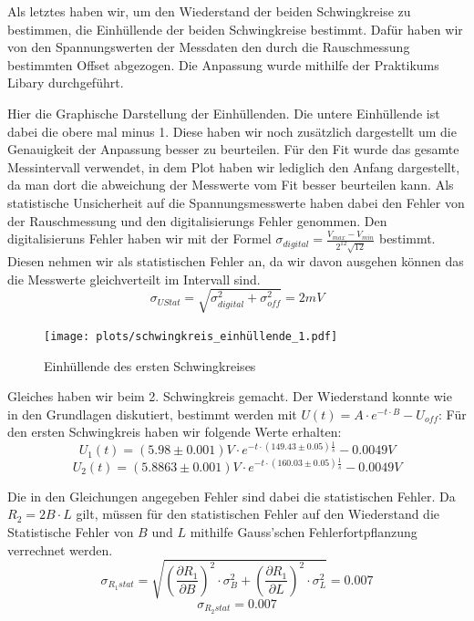 \documentclass[twoside]{protokoll}
\begin{document}
Als letztes haben wir, um den Wiederstand der beiden Schwingkreise zu bestimmen, die Einhüllende der beiden Schwingkreise bestimmt.
Dafür haben wir von den Spannungswerten der Messdaten den durch die Rauschmessung bestimmten Offset abgezogen.
Die Anpassung wurde mithilfe der Praktikums Libary durchgeführt.
 
Hier die Graphische Darstellung der Einhüllenden.
Die untere Einhüllende ist dabei die obere mal minus 1.
Diese haben wir noch zusätzlich dargestellt um die Genauigkeit der Anpassung besser zu beurteilen.
Für den Fit wurde das gesamte Messintervall verwendet, in dem Plot haben wir lediglich den Anfang dargestellt, da man dort die abweichung der Messwerte vom Fit besser beurteilen kann.
Als statistische Unsicherheit auf die Spannungsmesswerte haben dabei den Fehler von der Rauschmessung und den digitalisierungs Fehler genommen.
Den digitalisieruns Fehler haben wir mit der Formel $ \sigma_{digital} = \frac{V_{max} - V_{min}}{2^{12} \sqrt{12}}$ bestimmt.
Diesen nehmen wir als statistischen Fehler an, da wir davon ausgehen können das die Messwerte gleichverteilt im Intervall sind.
\begin{equation}
    \sigma_{U Stat} = \sqrt{ \sigma_{digital}^2 +  \sigma_{off}^2} = 2mV
\end{equation}
\begin{figure}[H]
    \centering
    \texttt{[image: plots/schwingkreis\_einhüllende\_1.pdf]}
    \caption{Einhüllende des ersten Schwingkreises}
\end{figure}

Gleiches haben wir beim 2. Schwingkreis gemacht.
Der Wiederstand konnte wie in den Grundlagen diskutiert, bestimmt werden mit $ U(t) = A \cdot e^{-t \cdot B} - U_{off}$:
Für den ersten Schwingkreis haben wir folgende Werte erhalten:
\begin{equation}
    U_1(t) = (5.98 \pm 0.001)V \cdot e^{-t \cdot (149.43 \pm 0.05) \frac{1}{s} } - 0.0049 V
\end{equation}
\begin{equation}
    U_2(t) = (5.8863 \pm 0.001)V \cdot e^{-t \cdot (160.03 \pm 0.05) \frac{1}{s} } - 0.0049 V
\end{equation}

Die in den Gleichungen angegeben Fehler sind dabei die statistischen Fehler.
Da $R_2 = 2 B \cdot L$ gilt, müssen für den statistischen Fehler auf den Wiederstand die Statistische Fehler von $B$ und $L$ mithilfe Gauss'schen Fehlerfortpflanzung verrechnet werden.
\begin{equation}
    \sigma_{R_1 stat} = \sqrt{ \left( \frac{\partial R_1}{\partial B} \right)^2 \cdot \sigma_{B}^2 + \left( \frac{\partial R_1}{\partial L} \right)^2 \cdot \sigma_{L}^2} 
    = 0.007
\end{equation}
\begin{equation}
    \sigma_{R_2 stat} = 0.007
\end{equation}
\end{document}

